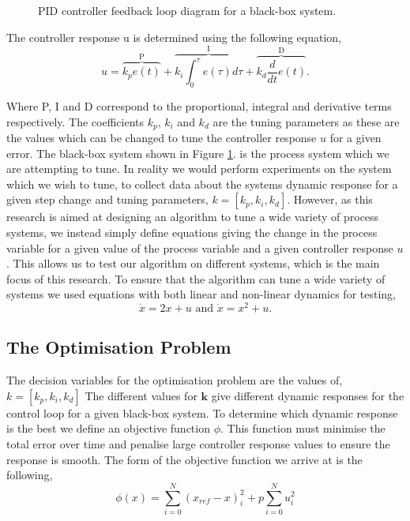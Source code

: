 \documentclass[conference]{IEEEtran}
\theoremstyle{definition}
\begin{document}
\begin{figure}[htbp]
\caption{PID controller feedback loop diagram for a black-box system.}
\label{control_loop}
\end{figure}

\noindent The controller response u is determined using the following equation,
\begin{equation}
    u = \overbrace{k_p e(t)}^\text{P} + \overbrace{k_i \int_{0}^{\tau}e(\tau)d\tau}^\text{I} + \overbrace{k_d \frac{d}{dt}e(t)}^\text{D}.
\end{equation}

\noindent Where P, I and D correspond to the proportional, integral and derivative terms respectively. The coefficients $k_p$, $k_i$ and $k_d$ are the tuning parameters as these are the values which can be changed to tune the controller response $u$ for a given error. The black-box system shown in Figure \ref{control_loop}. is the process system which we are attempting to tune. In reality we would perform experiments on the system which we wish to tune, to collect data about the systems dynamic response for a given step change and tuning parameters, $k=[k_p, k_i, k_d]$. However, as this research is aimed at designing an algorithm to tune a wide variety of process systems, we instead simply define equations giving the change in the process variable for a given value of the process variable and a given controller response $u$. This allows us to test our algorithm on different systems, which is the main focus of this research. To ensure that the algorithm can tune a wide variety of systems we used equations with both linear and non-linear dynamics for testing,
\begin{equation}
    \dot{x} = 2x + u \textrm{ and } \dot{x} = x^2 + u.
\end{equation}

\subsection{The Optimisation Problem}
\noindent The decision variables for the optimisation problem are the values of, $k=[k_p,k_i,k_d]$ The different values for $\mathbf{k}$ give different dynamic responses for the control loop for a given black-box system. To determine which dynamic response is the best we define an objective function $\phi$. This function must minimise the total error over time and penalise large controller response values to ensure the response is smooth. The form of the objective function we arrive at is the following,
\begin{equation}
    \phi(x) = \sum_{i=0}^{N}(x_{ref} - x)^2_i + p\sum_{i=0}^{N}u_i^2
\end{equation}
\end{document}
